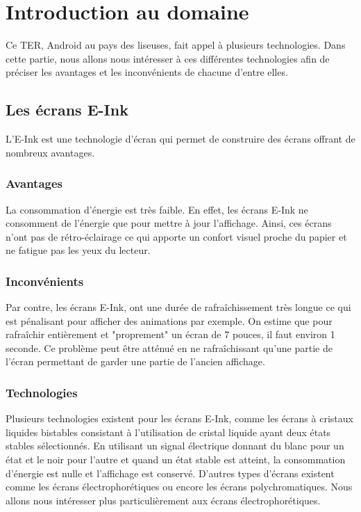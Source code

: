 \chapter{Introduction au domaine}
Ce TER, Android au pays des liseuses, fait appel à plusieurs technologies. Dans cette partie, nous allons nous intéresser à ces différentes technologies afin de préciser les avantages et les inconvénients de chacune d'entre elles.

\section{Les écrans E-Ink}
L'E-Ink est une technologie d'écran qui permet de construire des écrans offrant de nombreux avantages.

\subsection{Avantages}
La consommation d'énergie est très faible. En effet, les écrans E-Ink ne consomment de l'énergie que pour mettre à jour l'affichage. Ainsi, ces écrans n'ont pas de rétro-éclairage ce qui apporte un confort visuel proche du papier et ne fatigue pas les yeux du lecteur. 

\subsection{Inconvénients}
Par contre, les écrans E-Ink, ont une durée de rafraîchissement très longue ce qui est pénalisant pour afficher des animations par exemple. On estime que pour rafraîchir entièrement et "proprement" un écran de 7 pouces, il faut environ 1 seconde. Ce problème peut être atténué en ne rafraîchissant qu'une partie de l'écran permettant de garder une partie de l'ancien affichage. 

\subsection{Technologies}

Plusieurs technologies existent pour les écrans E-Ink, comme les écrans à cristaux liquides bistables consistant à l'utilisation de cristal liquide ayant deux états stables sélectionnés. En utilisant un signal électrique donnant du blanc pour un état et le noir pour l'autre et quand un état stable est atteint, la consommation d'énergie est nulle et l'affichage est conservé. D'autres types d'écrans existent comme les écrans électrophorétiques ou encore les écrans polychromatiques. Nous allons nous intéresser plus particulièrement aux écrans électrophorétiques.

